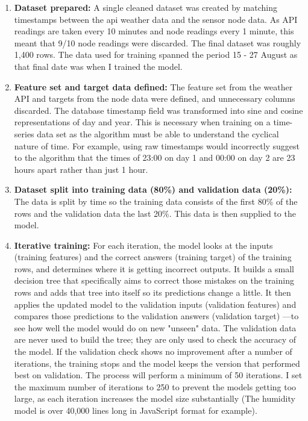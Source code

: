 \documentclass[conference]{IEEEtran}
\begin{document}
\begin{enumerate}
    \item \textbf{Dataset prepared:} A single cleaned dataset was created by
          matching timestamps between the api weather data and the sensor node
          data. As API readings are taken every 10 minutes and node readings
          every 1 minute, this meant that 9/10 node readings were discarded. The
          final dataset was roughly 1,400 rows. The data used for training
          spanned the period 15 - 27 August as that final date was when I
          trained the model.
    \item \textbf{Feature set and target data defined:} The feature set from the
          weather API and targets from the node data were defined, and
          unnecessary columns discarded. The database timestamp field was
          transformed into sine and cosine representations of day and year. This
          is necessary when training on a time-series data set as the algorithm
          must be able to understand the cyclical nature of time. For example,
          using raw timestamps would incorrectly suggest to the algorithm that
          the times of 23:00 on day 1 and 00:00 on day 2 are 23 hours apart
          rather than just 1 hour.
    \item \textbf{Dataset split into training data (80\%) and validation data
          (20\%):} The data is split by time so the training data consists of
          the first 80\% of the rows and the validation data the last 20\%. This
          data is then supplied to the model.
    \item \textbf{Iterative training:} For each iteration, the model looks at
          the inputs (training features) and the correct answers (training
          target) of the training rows, and determines where it is getting
          incorrect outputs. It builds a small decision tree that specifically
          aims to correct those mistakes on the training rows and adds that tree
          into itself so its predictions change a little. It then applies the
          updated model to the validation inputs (validation features) and
          compares those predictions to the validation answers (validation
          target) —to see how well the model would do on new "unseen" data. The
          validation data are never used to build the tree; they are only used
          to check the accuracy of the model. If the validation check shows no
          improvement after a number of iterations, the training stops and the
          model keeps the version that performed best on validation.  The
          process will perform a minimum of 50 iterations. I set the maximum
          number of iterations to 250 to prevent the models getting too large,
          as each iteration increases the model size substantially (The humidity
          model is over 40,000 lines long in JavaScript format for example).
\end{enumerate}
\end{document}
